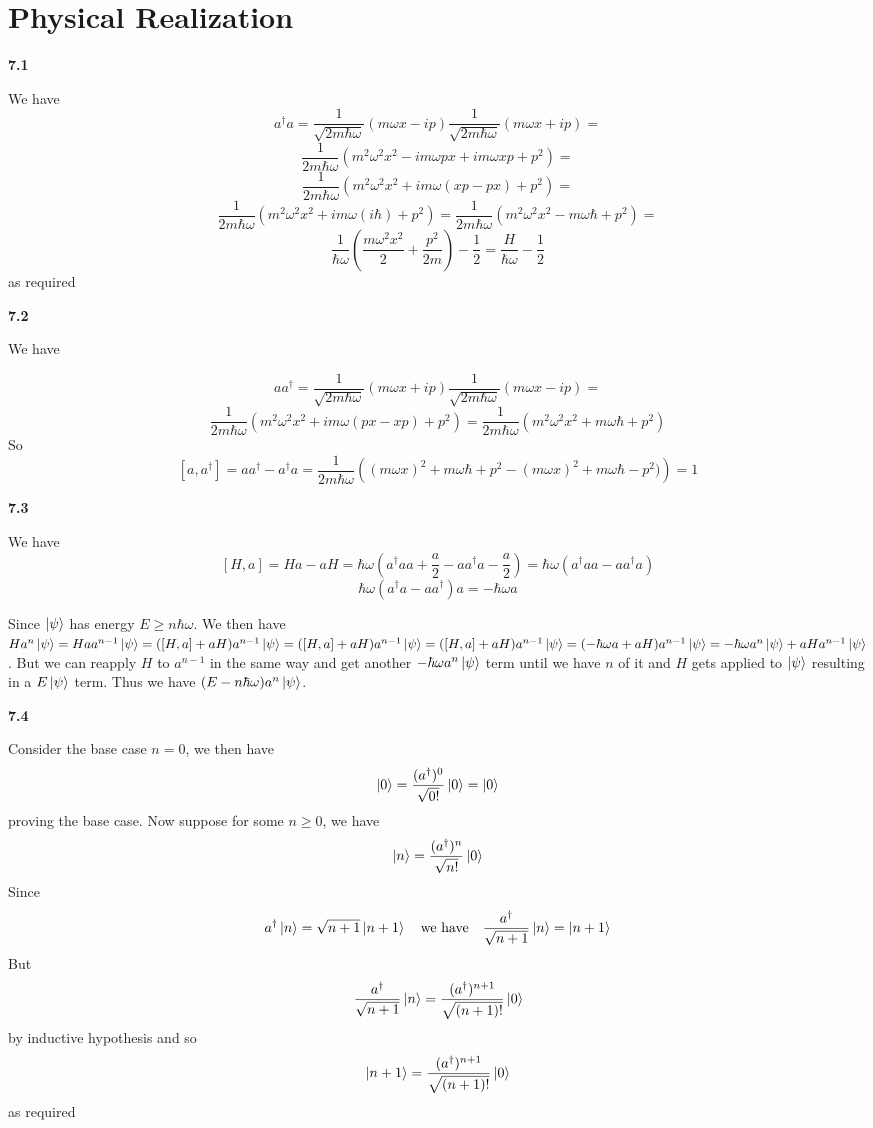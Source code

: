 \section{Physical Realization}

\textbf{7.1}

We have \[a^\dag a =\frac{1}{\sqrt{2m\hbar\omega}}\left(m\omega x -ip\right)\frac{1}{\sqrt{2m\hbar\omega}}\left(m\omega x + ip\right) =\]
\[\frac{1}{2m\hbar\omega}(m^2\omega^2x^2 -im\omega px +im\omega x p +p^2) = \]
\[\frac{1}{2m\hbar\omega}(m^2\omega^2x^2 +im\omega (x p-px ) +p^2) =\]
\[\frac{1}{2m\hbar\omega}(m^2\omega^2x^2 +im\omega(i\hbar) +p^2) =\frac{1}{2m\hbar\omega}(m^2\omega^2x^2 -m\omega\hbar +p^2) =  \]
\[\frac{1}{\hbar\omega}\left(\frac{m\omega^2x^2}{2} +\frac{p^2}{2m}\right)-\frac{1}{2} = \frac{H}{\hbar\omega } - \frac{1}{2}\]
as required

\textbf{7.2}

We have 

\[aa^\dag = \frac{1}{\sqrt{2m\hbar\omega}}\left(m\omega x +ip\right)\frac{1}{\sqrt{2m\hbar\omega}}\left(m\omega x - ip\right)= \]
\[\frac{1}{2m\hbar\omega}(m^2\omega^2x^2 +im\omega (px-xp) +p^2) = \frac{1}{2m\hbar\omega}(m^2\omega^2x^2 +m\omega\hbar +p^2) \]
So
\[[a, a^\dag] = aa^\dag - a^\dag a = \frac{1}{2m\hbar\omega}\left((m\omega x)^2 +m\omega\hbar +p^2 - (m\omega x)^2 +m\omega\hbar -p^2)\right)= 1\]

\textbf{7.3}

We have 
\[[H,a] = Ha -a H =\hbar\omega \left(a^\dag aa + \frac{a}{2}-aa^\dag a -\frac{a}{2}\right) = \hbar\omega\left(a^\dag aa -aa^\dag a\right) \]\[\hbar \omega\left(a^\dag a - a a^\dag\right)a = -\hbar \omega a \]

Since $\ket{\psi}$ has energy $ E\geq n\hbar \omega$. We then have $ Ha^n\ket{\psi} = H a a^{n-1}\ket{\psi} = ([H,a] + aH)a^{n-1} \ket{\psi} =([H,a] + aH)a^{n-1} \ket{\psi}=([H,a] + aH)a^{n-1} \ket{\psi} = (-\hbar\omega a + aH)a^{n-1}\ket{\psi} = -\hbar\omega a^n\ket{\psi}+ aHa^{n-1}\ket{\psi}$. But we can reapply $H$ to $a^{n-1}$ in the same way and get another $-\hbar \omega a^n\ket{\psi}$ term until we have $ n$ of it and $H$ gets applied to $\ket{\psi}$ resulting in a $ E\ket{\psi}$ term. Thus we have $(E -n\hbar \omega)a^n\ket{\psi}$.


\textbf{7.4}

Consider the base case $ n=0$, we then have
\[\ket{0} = \frac{(a^\dag)^0}{\sqrt{0!}}\ket{0} = \ket{0}\] proving the base case.
Now suppose for some $n\geq 0$, we have \[\ket{n} = \frac{(a^\dag)^n}{\sqrt{n!}}\ket{0}\] Since \[a^\dag \ket{n} = \sqrt{n+1}\ket{n+1} \quad\text{we have} \quad \frac{a^\dag}{\sqrt{n+1}} \ket{n} = \ket{n+1}\] But \[\frac{a^\dag}{\sqrt{n+1}} \ket{n}  =  \frac{(a^\dag)^{n+1}}{\sqrt{(n+1)!}}\ket{0}\] by inductive hypothesis and so 
\[\ket{n+1} = \frac{(a^\dag)^{n+1}}{\sqrt{(n+1)!}}\ket{0}\]
as required

